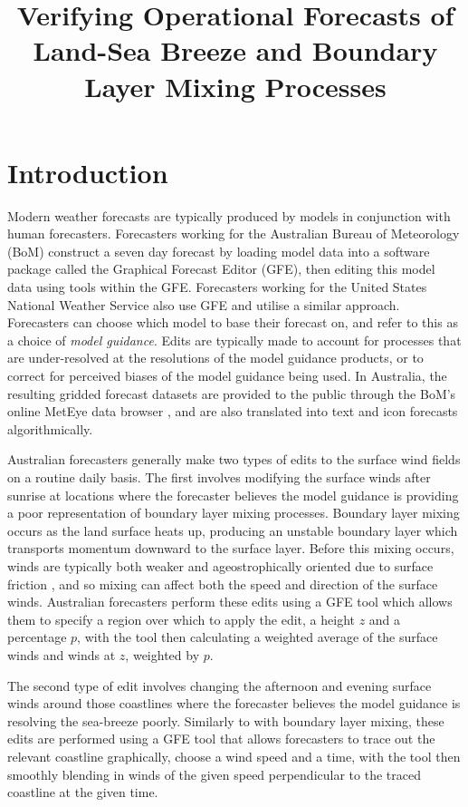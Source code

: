 \documentclass[twocol]{ametsoc}
\title{Verifying Operational Forecasts of Land-Sea Breeze and Boundary Layer Mixing Processes}
\affiliation{School of Earth Sciences, and ARC Centre of Excellence for Climate Extremes, The University of Melbourne, Melbourne, Victoria, Australia.}
\begin{document}
\maketitle

\section{Introduction}
\label{Sec:Introduction}
Modern weather forecasts are typically produced by models in conjunction with human forecasters. Forecasters working for the Australian Bureau of Meteorology (BoM) construct a seven day forecast by loading model data into a software package called the Graphical Forecast Editor (GFE), then editing this model data using tools within the GFE. Forecasters working for the United States National Weather Service also use GFE and utilise a similar approach. Forecasters can choose which model to base their forecast on, and refer to this as a choice of \textit{model guidance}. Edits are typically made to account for processes that are under-resolved at the resolutions of the model guidance products, or to correct for perceived biases of the model guidance being used. In Australia, the resulting gridded forecast datasets are provided to the public through the BoM's online MetEye data browser \citep{bomMetEye19}, and are also translated into text and icon forecasts algorithmically. 

Australian forecasters generally make two types of edits to the surface wind fields on a routine daily basis. The first involves modifying the surface winds after sunrise at locations where the forecaster believes the model guidance is providing a poor representation of boundary layer mixing processes. Boundary layer mixing occurs as the land surface heats up, producing an unstable boundary layer which transports momentum downward to the surface layer. Before this mixing occurs, winds are typically both weaker and ageostrophically oriented due to surface friction \citep{lee18}, and so mixing can affect both the speed and direction of the surface winds. Australian forecasters perform these edits using a GFE tool which allows them to specify a region over which to apply the edit, a height $z$ and a percentage $p$, with the tool then calculating a weighted average of the surface winds and winds at $z$, weighted by $p$.

The second type of edit involves changing the afternoon and evening surface winds around those coastlines where the forecaster believes the model guidance is resolving the sea-breeze poorly. Similarly to with boundary layer mixing, these edits are performed using a GFE tool that allows forecasters to trace out the relevant coastline graphically, choose a wind speed and a time, with the tool then smoothly blending in winds of the given speed perpendicular to the traced coastline at the given time.
\end{document}
